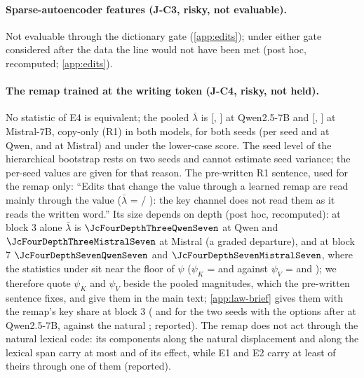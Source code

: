 \paragraph{Sparse-autoencoder features (J-C3, risky, not evaluable).} Not evaluable through the dictionary gate (\cref{app:edits}); under either gate considered after the data the line would not have been met (post hoc, recomputed; \cref{app:edits}).

\paragraph{The remap trained at the writing token (J-C4, risky, not held).} No statistic of E4 is equivalent; the pooled $\bar\lambda$ is \JcFourPoolEfourQwenSeven{} [\JcFourPoolEfourQwenSevenLo{}, \JcFourPoolEfourQwenSevenHi{}] at Qwen2.5-7B and \JcFourPoolEfourMistralSeven{} [\JcFourPoolEfourMistralSevenLo{}, \JcFourPoolEfourMistralSevenHi{}] at Mistral-7B, copy-only (R1) in both models, for both seeds (per seed \JcFourPoolEfouraQwenSeven{} and \JcFourPoolEfourbQwenSeven{} at Qwen, \JcFourPoolEfouraMistralSeven{} and \JcFourPoolEfourbMistralSeven{} at Mistral) and under the lower-case score. The seed level of the hierarchical bootstrap rests on two seeds and cannot estimate seed variance; the per-seed values are given for that reason. The pre-written R1 sentence, used for the remap only: ``Edits that change the value through a learned remap are read mainly through the value ($\bar\lambda$ = \JcFourPoolEfourQwenSeven{} / \JcFourPoolEfourMistralSeven{}): the key channel does not read them as it reads the written word.'' Its size depends on depth (post hoc, recomputed): at block 3 alone $\bar\lambda$ is $\JcFourDepthThreeQwenSeven$ at Qwen and $\JcFourDepthThreeMistralSeven$ at Mistral (a graded departure), and at block 7 $\JcFourDepthSevenQwenSeven$ and $\JcFourDepthSevenMistralSeven$, where the statistics under \fmtPost{} sit near the floor of $\psi$ ($\psi_K$ = \JcFourPsiKWpostSevenQwenSeven{} and \JcFourPsiKWpostSevenMistralSeven{} against $\psi_V$ = \JcFourPsiVWpostSevenQwenSeven{} and \JcFourPsiVWpostSevenMistralSeven{}); we therefore quote $\psi_K$ and $\psi_V$ beside the pooled magnitudes, which the pre-written sentence fixes, and give them in the main text; \cref{app:law-brief} gives them with the remap's key share at block 3 (\JcKappaEfouraOptThreeQwenSeven{} and \JcKappaEfourbOptThreeQwenSeven{} for the two seeds with the options after at Qwen2.5-7B, against the natural \JcSigmaOptThreeQwenSeven{}; reported). The remap does not act through the natural lexical code: its components along the natural displacement and along the lexical span carry at most \JcLexParShareEfourMax{} and \JcLexLexShareEfourMax{} of its effect, while E1 and E2 carry at least \JcLexCodeShareNearMin{} of theirs through one of them (reported). %

